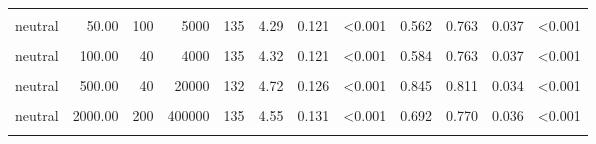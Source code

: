 \documentclass[
]{article}
\begin{document}
\begin{longtable}[t]{lrrrrrrlrrrl}
\hspace{1em}\cellcolor{gray!10}{neutral} & \cellcolor{gray!10}{50.00} & \cellcolor{gray!10}{10} & \cellcolor{gray!10}{500} & \cellcolor{gray!10}{132} & \cellcolor{gray!10}{4.46} & \cellcolor{gray!10}{0.117} & \cellcolor{gray!10}{<0.001} & \cellcolor{gray!10}{0.713} & \cellcolor{gray!10}{0.788} & \cellcolor{gray!10}{0.036} & \cellcolor{gray!10}{<0.001}\\
\hspace{1em}neutral & 50.00 & 100 & 5000 & 135 & 4.29 & 0.121 & <0.001 & 0.562 & 0.763 & 0.037 & <0.001\\
\hspace{1em}\cellcolor{gray!10}{neutral} & \cellcolor{gray!10}{100.00} & \cellcolor{gray!10}{30} & \cellcolor{gray!10}{3000} & \cellcolor{gray!10}{132} & \cellcolor{gray!10}{4.49} & \cellcolor{gray!10}{0.115} & \cellcolor{gray!10}{<0.001} & \cellcolor{gray!10}{0.757} & \cellcolor{gray!10}{0.773} & \cellcolor{gray!10}{0.037} & \cellcolor{gray!10}{<0.001}\\
\hspace{1em}neutral & 100.00 & 40 & 4000 & 135 & 4.32 & 0.121 & <0.001 & 0.584 & 0.763 & 0.037 & <0.001\\
\hspace{1em}\cellcolor{gray!10}{neutral} & \cellcolor{gray!10}{500.00} & \cellcolor{gray!10}{10} & \cellcolor{gray!10}{5000} & \cellcolor{gray!10}{135} & \cellcolor{gray!10}{4.56} & \cellcolor{gray!10}{0.128} & \cellcolor{gray!10}{<0.001} & \cellcolor{gray!10}{0.716} & \cellcolor{gray!10}{0.793} & \cellcolor{gray!10}{0.035} & \cellcolor{gray!10}{<0.001}\\
\hspace{1em}neutral & 500.00 & 40 & 20000 & 132 & 4.72 & 0.126 & <0.001 & 0.845 & 0.811 & 0.034 & <0.001\\
\hspace{1em}\cellcolor{gray!10}{neutral} & \cellcolor{gray!10}{2000.00} & \cellcolor{gray!10}{20} & \cellcolor{gray!10}{40000} & \cellcolor{gray!10}{132} & \cellcolor{gray!10}{4.97} & \cellcolor{gray!10}{0.119} & \cellcolor{gray!10}{<0.001} & \cellcolor{gray!10}{1.082} & \cellcolor{gray!10}{0.864} & \cellcolor{gray!10}{0.030} & \cellcolor{gray!10}{<0.001}\\
\hspace{1em}neutral & 2000.00 & 200 & 400000 & 135 & 4.55 & 0.131 & <0.001 & 0.692 & 0.770 & 0.036 & <0.001\\
\hspace{1em}\cellcolor{gray!10}{neutral} & \cellcolor{gray!10}{10000.00} & \cellcolor{gray!10}{30} & \cellcolor{gray!10}{300000} & \cellcolor{gray!10}{135} & \cellcolor{gray!10}{4.82} & \cellcolor{gray!10}{0.122} & \cellcolor{gray!10}{<0.001} & \cellcolor{gray!10}{0.929} & \cellcolor{gray!10}{0.852} & \cellcolor{gray!10}{0.031} & \cellcolor{gray!10}{<0.001}\\

\end{longtable}
\end{document}
